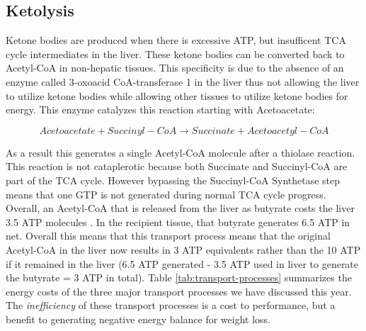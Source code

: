 \documentclass{tufte-handout}
\begin{document}
\subsection{Ketolysis}

Ketone bodies are produced when there is excessive ATP, but insufficent TCA cycle intermediates in the liver.  These ketone bodies can be converted back to Acetyl-CoA in non-hepatic tissues.  This specificity is due to the absence of an enzyme called 3-oxoacid CoA-transferase 1 in the liver thus not allowing the liver to utilize ketone bodies while allowing other tissues to utilize ketone bodies for energy.  This enzyme catalyzes this reaction starting with Acetoacetate:

\begin{equation}\label{eq:oxct1}
Acetoacetate + Succinyl-CoA \rightarrow Succinate + Acetoacetyl-CoA
\end{equation} 

As a result this generates a single Acetyl-CoA molecule after a thiolase reaction.  This reaction is not cataplerotic because both Succinate and Succinyl-CoA are part of the TCA cycle.  However bypassing the Succinyl-CoA Synthetase step means that one GTP is not generated during normal TCA cycle progress.  Overall, an Acetyl-CoA that is released from the liver as butyrate costs the liver 3.5 ATP molecules .  In the recipient tissue, that butyrate generates 6.5 ATP in net.  Overall this means that this transport process means that the original Acetyl-CoA in the liver now results in 3 ATP equivalents rather than the 10 ATP if it remained in the liver (6.5 ATP generated - 3.5 ATP used in liver to generate the butyrate = 3 ATP in total).  Table \ref{tab:transport-processes} summarizes the energy costs of the three major transport processes we have discussed this year.  The \emph{inefficiency} of these transport processes is a cost to performance, but a benefit to generating negative energy balance for weight loss.
\end{document}
